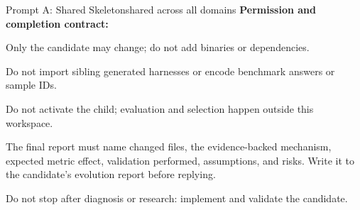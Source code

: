 \documentclass[11pt,a4paper]{article}
\newcommand{\phead}[1]{{\color{lopdteal!85!black}\bfseries #1}}
\begin{document}
\begin{promptbox}{Prompt A: Shared Skeleton}{shared across all domains}
\phead{Permission and completion contract:}
\begin{plist}
\item Only the candidate may change; do not add binaries or dependencies.
\item Do not import sibling generated harnesses or encode benchmark answers or sample IDs.
\item Do not activate the child; evaluation and selection happen outside this workspace.
\item The final report must name changed files, the evidence-backed mechanism, expected metric effect, validation performed, assumptions, and risks. Write it to the candidate's evolution report before replying.
\item Do not stop after diagnosis or research: implement and validate the candidate.
\end{plist}
\end{promptbox}
\end{document}
